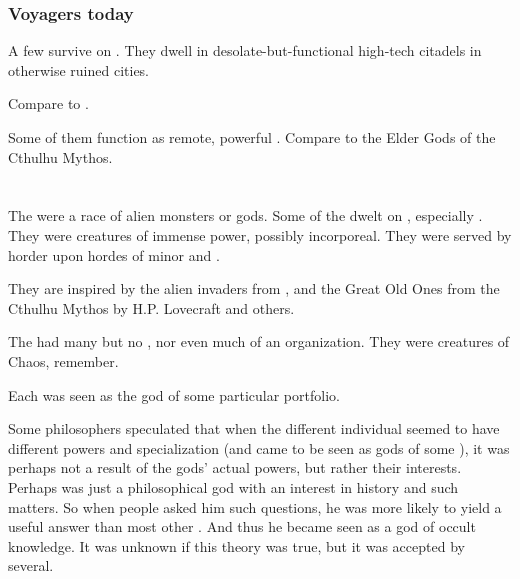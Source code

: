\subsubsection{Voyagers today}
A few \voyagers{} survive on \Miith{}. They dwell in desolate-but-functional high-tech citadels in otherwise ruined cities. 

Compare to .

Some of them function as remote, powerful . Compare to the Elder Gods of the Cthulhu Mythos. 















\section{\XzaiShanns}
\index{\xzaishann}
The \xzaishanns{} were a race of alien monsters or gods. 
Some of the dwelt on \Miith, especially . 
They were creatures of immense power, possibly incorporeal. 
They were served by horder upon hordes of minor \mdaemons{} and \mdaemons.

They are inspired by the alien invaders from , and the Great Old Ones from the Cthulhu Mythos by H.P. Lovecraft and others. 

The \xss{} had many  but no , nor even much of an organization. 
They were creatures of Chaos, remember. 

Each \xs was seen as the god of some particular portfolio. 

Some \draconian philosophers speculated that when the different individual \xss seemed to have different powers and specialization (and came to be seen as gods of some ), it was perhaps not a result of the gods' actual powers, but rather their interests.
Perhaps \NerranKoss was just a philosophical god with an interest in history and such matters. 
So when people asked him such questions, he was more likely to yield a useful answer than most other \xss.
And thus he became seen as a god of occult knowledge. 
It was unknown if this theory was true, but it was accepted by several. 








